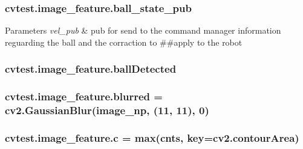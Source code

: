 \subsubsection[{\texorpdfstring{ball\+\_\+state\+\_\+pub}{ball_state_pub}}]{\setlength{\rightskip}{0pt plus 5cm}cvtest.\+image\+\_\+feature.\+ball\+\_\+state\+\_\+pub}\hypertarget{classcvtest_1_1image__feature_ab403e0a9a287776c122a37bf00d70d4f}{}\label{classcvtest_1_1image__feature_ab403e0a9a287776c122a37bf00d70d4f}

\begin{DoxyParams}{Parameters}
{\em vel\+\_\+pub} & pub for send to the command manager information reguarding the ball and the corraction to \#\#apply to the robot \\
\hline
\end{DoxyParams}
\subsubsection[{\texorpdfstring{ball\+Detected}{ballDetected}}]{\setlength{\rightskip}{0pt plus 5cm}cvtest.\+image\+\_\+feature.\+ball\+Detected\hspace{0.3cm}{\ttfamily [static]}}\hypertarget{classcvtest_1_1image__feature_af899715bd474bd282df372479b5c1f74}{}\label{classcvtest_1_1image__feature_af899715bd474bd282df372479b5c1f74}
\subsubsection[{\texorpdfstring{blurred}{blurred}}]{\setlength{\rightskip}{0pt plus 5cm}cvtest.\+image\+\_\+feature.\+blurred = cv2.\+Gaussian\+Blur(image\+\_\+np, (11, 11), 0)\hspace{0.3cm}{\ttfamily [static]}}\hypertarget{classcvtest_1_1image__feature_a85ee0bae4a9441fe6aebf107058843db}{}\label{classcvtest_1_1image__feature_a85ee0bae4a9441fe6aebf107058843db}
\subsubsection[{\texorpdfstring{c}{c}}]{\setlength{\rightskip}{0pt plus 5cm}cvtest.\+image\+\_\+feature.\+c = max({\bf cnts}, key=cv2.\+contour\+Area)\hspace{0.3cm}{\ttfamily [static]}}\hypertarget{classcvtest_1_1image__feature_a1293e76127df14d91e3abd546415d7f3}{}\label{classcvtest_1_1image__feature_a1293e76127df14d91e3abd546415d7f3}


